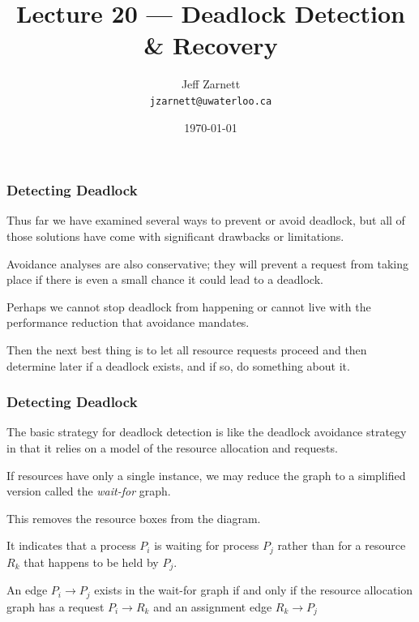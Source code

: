

\title{Lecture 20 --- Deadlock Detection \& Recovery }

\author{Jeff Zarnett \\ \small \texttt{jzarnett@uwaterloo.ca}}
\date{\today}




\begin{frame}
  \titlepage

 \end{frame}


\begin{frame}
\frametitle{Detecting Deadlock}

Thus far we have examined several ways to prevent or avoid deadlock, but all of those solutions have come with significant drawbacks or limitations. 

Avoidance analyses are also conservative; they will prevent a request from taking place if there is even a small chance it could lead to a deadlock. 

Perhaps we cannot stop deadlock from happening or cannot live with the performance reduction that avoidance mandates.

Then the next best thing is to let all resource requests proceed and then determine later if a deadlock exists, and if so, do something about it.

\end{frame}


\begin{frame}
\frametitle{Detecting Deadlock}

The basic strategy for deadlock detection is like the deadlock avoidance strategy in that it relies on a model of the resource allocation and requests. 

If resources have only a single instance, we may reduce the graph to a simplified version called the \textit{wait-for} graph. 

This removes the resource boxes from the diagram.

It indicates that a process $P_{i}$ is waiting for process $P_{j}$ rather than for a resource $R_{k}$ that happens to be held by $P_{j}$. 

An edge $P_{i} \rightarrow P_{j}$ exists in the wait-for graph if and only if the resource allocation graph has a request $P_{i} \rightarrow R_{k}$ and an assignment edge $R_{k} \rightarrow P_{j}$

\end{frame}

